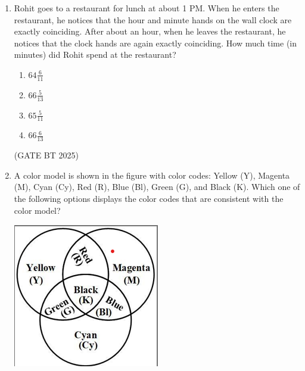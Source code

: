 \documentclass[journal,12pt,onecolumn]{IEEEtran}
\theoremstyle{remark}
\begin{document}
\begin{enumerate}
\item Rohit goes to a restaurant for lunch at about 1 PM. When he enters the restaurant, he notices that the hour and minute hands on the wall clock are exactly coinciding. After about an hour, when he leaves the restaurant, he notices that the clock hands are again exactly coinciding. How much time (in minutes) did Rohit spend at the restaurant?  

\begin{enumerate}
    \item $64 \frac{6}{11}$
    \item $66 \frac{5}{13}$
    \item $65 \frac{5}{11}$
    \item $66 \frac{6}{13}$
\end{enumerate} 
\hfill (GATE BT 2025)

\item A color model is shown in the figure with color codes: Yellow (Y), Magenta (M), Cyan (Cy), Red (R), Blue (Bl), Green (G), and Black (K).  
Which one of the following options displays the color codes that are consistent with the color model?  

\begin{center}
    \includegraphics[width=0.6\columnwidth]{figs/question.png}
\end{center}


\end{enumerate}
\end{document}
